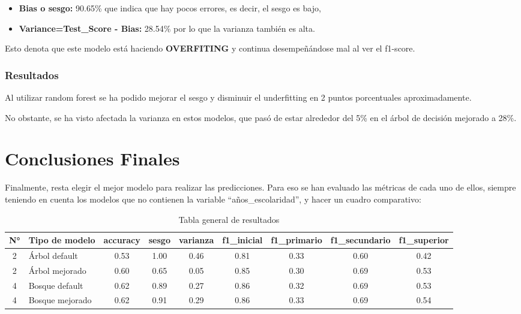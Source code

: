 \documentclass[a4paper]{article}
\begin{document}
            \begin{itemize}
                \item \textbf{Bias o sesgo:} 90.65\% que indica que hay pocos errores, es decir, el sesgo es bajo,
                \item \textbf{Variance=Test\_Score - Bias:} 28.54\% por lo que la varianza también es alta. 
            \end{itemize} 

            Esto denota que este modelo está haciendo \textbf{OVERFITING} y continua desempeñándose mal al ver el f1-score.
            
            \subsubsection*{Resultados}
            
             Al utilizar random forest  se ha podido mejorar el sesgo y disminuir el underfitting en 2 puntos porcentuales aproximadamente.
    
            No obstante, se ha visto afectada la varianza en estos modelos, que pasó de estar alrededor del 5\% en el árbol de decisión mejorado a 28\%.

\newpage

\section{Conclusiones Finales}

    Finalmente, resta elegir el mejor modelo para realizar las predicciones. Para eso se han evaluado las métricas de cada uno de ellos, siempre teniendo en cuenta los modelos que no contienen la variable ``años\_escolaridad'', y hacer un cuadro comparativo:
    
    \begin{table}[H]
        \centering
        \begin{tabular}{ clccccccc }
            \toprule
           N° & Tipo de modelo & accuracy & sesgo & varianza & f1\_inicial & f1\_primario & f1\_secundario & f1\_superior \\ \midrule
           2  & Árbol default & 0.53 & 1.00 & 0.46 & 0.81 & 0.33 & 0.60 & 0.42 \\ 
           2  &  Árbol mejorado & 0.60 & 0.65 & 0.05 & 0.85 & 0.30 & 0.69 & 0.53 \\
           4  & Bosque default & 0.62 & 0.89 & 0.27 & 0.86 & 0.32 & 0.69 & 0.53 \\ 
           4  & Bosque mejorado & 0.62 & 0.91 & 0.29 & 0.86 & 0.33 & 0.69 & 0.54 \\
           \bottomrule
        \end{tabular}
        \caption{Tabla general de resultados}
        \label{Result table}
    \end{table}
\end{document}
